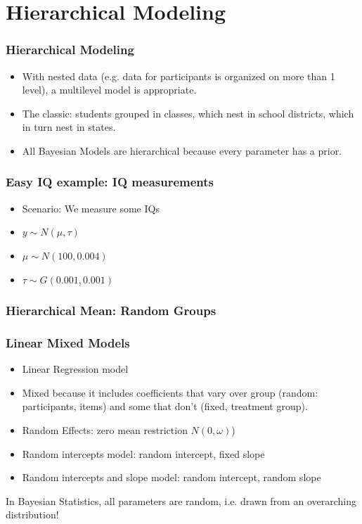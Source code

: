 \documentclass[hyperref={pdfpagelabels=false},unknownkeysallowed]{beamer}
\begin{document}
\section{Hierarchical Modeling}
\begin{frame}
\frametitle{Hierarchical Modeling}

\begin{itemize}
\item With nested data (e.g. data for participants is organized on more than 1 level), a multilevel model is appropriate. 

\item The classic: students grouped in classes, which nest in school districts, which in turn nest in states. 

\item All Bayesian Models are hierarchical because every parameter has a prior. 
\end{itemize} 

\note{}
\end{frame}


\begin{frame}
\frametitle{Easy IQ example: IQ measurements}
\begin{itemize}
    \item Scenario: We measure some IQs
	\item $y \sim N(\mu,\tau)$
    \item $\mu \sim N(100,0.004)$ 
    \item $\tau \sim G(0.001,0.001)$
    \end{itemize} 
\note{}
\end{frame}

\begin{frame}
\frametitle{Hierarchical Mean: Random Groups}
\begin{itemize}
\item $y \sim N(\mu[G],\tau)$
\item $\mu[G] \sim N(100,0.004})$
\item $tau \sim G(0.001,0.001)$
\end{itemize} 
\note{}
\end{frame}


\begin{frame}
\frametitle{Linear Mixed Models}

\begin{itemize}
\item Linear Regression model
\item Mixed because it includes coefficients that vary over group (random: participants, items) and some that don't (fixed, treatment group). 
\item Random Effects: zero mean restriction $N(0,\omega)$)
\item Random intercepts model: random intercept, fixed slope
\item Random intercepts and slope model: random intercept, random slope
\end{itemize} 
\centering In Bayesian Statistics, all parameters are random, i.e. drawn from an overarching distribution!  
\note{}
\end{frame}
\end{document}
